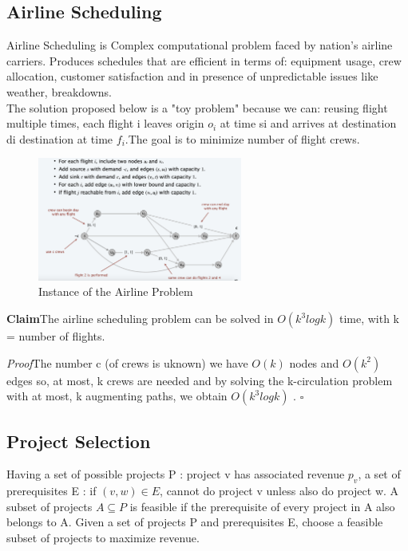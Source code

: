 \documentclass[11pt]{article}
\newenvironment{claim}[1]{\par\textbf{Claim}\space#1}{}
\newenvironment{proof}[1]{\par\textit{Proof}\space#1}{\hfill\ensuremath{\square}}
\begin{document}
\subsection{Airline Scheduling}

Airline Scheduling is Complex computational problem faced by nation's airline carriers. Produces schedules that are efficient in terms of: equipment usage, crew allocation, customer satisfaction
and in presence of unpredictable issues like weather, breakdowns.\\
The solution proposed below is a "toy problem" because we can: reusing flight multiple times, each
flight i leaves origin $o_{i}$ at time si and arrives at destination di destination at time $f_{i}$.The goal is to minimize number of flight crews.

\begin{figure}[H]
		\centering
		\includegraphics[width=0.6\textwidth ]{airline}
		\caption{Instance of the Airline Problem}
\end{figure}

\begin{claim}
The airline scheduling problem can be solved in $O(k^{3} log k)$ time, with k = number of flights.
\end{claim}

\begin{proof}
The number c (of crews is uknown) we have $O(k)$ nodes and $O(k^{2})$ edges so, at most, k crews are needed and by solving the k-circulation problem with at most, k augmenting paths, we obtain $O(k^{3} log k)$ .
\end{proof}

\subsection{Project Selection}
Having a set of possible projects P : project v has associated revenue $p_{v}$, a set of prerequisites E : if $(v, w) \in E$, cannot do project v unless also do project w. A subset of projects $A \subseteq P$ is feasible if the prerequisite of every project in A also belongs to A. Given a set of projects P and prerequisites E, choose a feasible subset of projects to maximize revenue.
\end{document}
